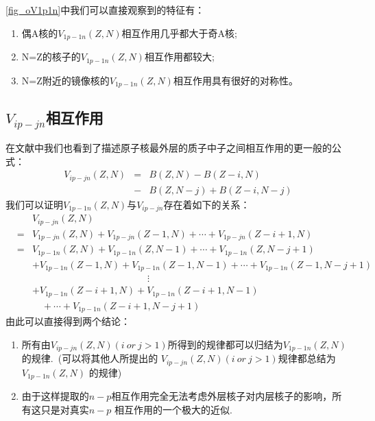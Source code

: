  \ref{fig_oV1p1n}中我们可以直接观察到的特征有：
\begin{enumerate}
  \item 偶A核的$V_{1p-1n}(Z,N)$相互作用几乎都大于奇A核;
  \item N=Z的核子的$V_{1p-1n}(Z,N)$相互作用都较大;
  \item N=Z附近的镜像核的$V_{1p-1n}(Z,N)$相互作用具有很好的对称性。
\end{enumerate}
\subsection{$V_{ip-jn}$相互作用}
在文献中我们也看到了描述原子核最外层的质子中子之间相互作用的更一般的公式：
\begin{eqnarray}
  V_{ip-jn}(Z,N)&=&B(Z,N)-B(Z-i,N)\nonumber\\
  &-&B(Z,N-j)+B(Z-i,N-j) \label{eq.Vipjn}
\end{eqnarray}
我们可以证明$V_{1p-1n}(Z,N)$与$V_{ip-jn}$存在着如下的关系：
\begin{eqnarray}
  &\ &V_{ip-jn}(Z,N)\nonumber\\
  &=&V_{1p-jn}(Z,N)+V_{1p-jn}(Z-1,N)+\cdots+V_{1p-jn}(Z-i+1,N)\nonumber\\
  &=&V_{1p-1n}(Z,N)+V_{1p-1n}(Z,N-1)+\cdots+V_{1p-1n}(Z,N-j+1)\nonumber\\
  &\ &+V_{1p-1n}(Z-1,N)+V_{1p-1n}(Z-1,N-1)+\cdots+V_{1p-1n}(Z-1,N-j+1)\nonumber\\
  &\ &\qquad\qquad\qquad\qquad\qquad\qquad\vdots\nonumber\\
  &\ &+V_{1p-1n}(Z-i+1,N)+V_{1p-1n}(Z-i+1,N-1)\nonumber\\
  &\ &\quad+\cdots+V_{1p-1n}(Z-i+1,N-j+1)\label{eq.Vpn}
\end{eqnarray}
由此可以直接得到两个结论：
\begin{enumerate}
\item 所有由$V_{ip-jn}(Z,N)(i\ or\ j>1)$所得到的规律都可以归结为$V_{1p-1n}(Z,N)$的规律.\ (可以将其他人所提出的 $V_{ip-jn}(Z,N)(i\ or\ j>1)$规律都总结为  $V_{1p-1n}(Z,N)$ 的规律)
\item 由于这样提取的$n-p$相互作用完全无法考虑外层核子对内层核子的影响，所有这只是对真实$n-p$ 相互作用的一个极大的近似.\
\end{enumerate}

